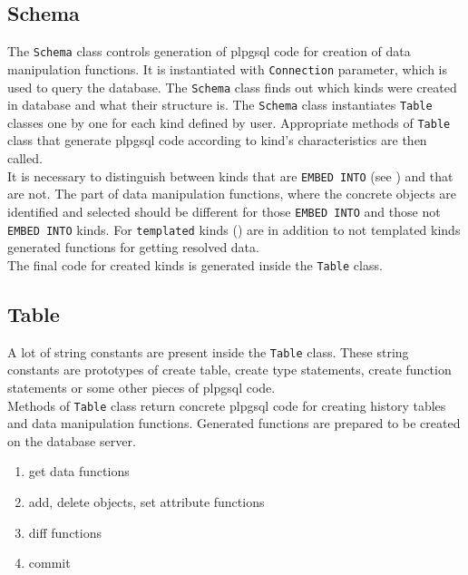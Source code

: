 \documentclass[deska]{subfiles}
\begin{document}
\subsection{Schema}
The {\tt Schema} class controls generation of plpgsql code for creation of data manipulation functions. It is instantiated with {\tt Connection} parameter, which is used to query the database. 
The {\tt Schema} class finds out which kinds were created in database and what their structure is. The {\tt Schema} class instantiates {\tt Table} classes one by one for each kind defined by user. Appropriate methods of {\tt Table} class that generate plpgsql code according to kind's characteristics are then called.\\ It is necessary to distinguish between kinds that are {\tt EMBED INTO} (see ) and that are not. The part of data manipulation functions, where the concrete objects are identified and selected should be different for those {\tt EMBED INTO} and those not {\tt EMBED INTO} kinds.
For {\tt templated} kinds () are in addition to not templated kinds generated functions for getting resolved data.\\
The final code for created kinds is generated inside the {\tt Table} class.

\subsection{Table}
A lot of string constants are present inside the {\tt Table} class. These string constants are prototypes of create table, create type statements, create function statements or some other pieces of plpgsql code.\\
Methods of {\tt Table} class return concrete plpgsql code for creating history tables and data manipulation functions. Generated functions are prepared to be created on the database server.\\

\begin{enumerate}
    \item get data functions
    \item add, delete objects, set attribute functions
    \item diff functions
    \item commit
\end{enumerate}
\end{document}
